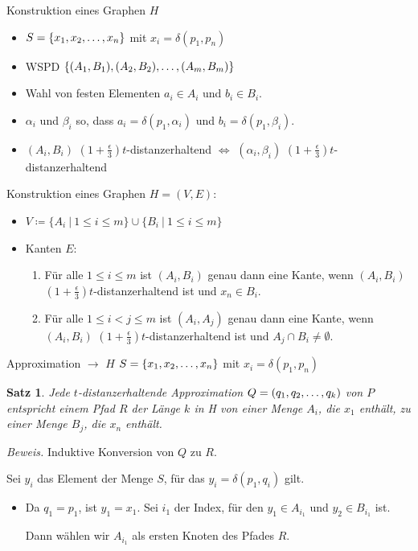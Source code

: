 \documentclass{beamer}
\newtheorem{thm}{Satz}
\begin{document}
	\begin{frame}[t]{Konstruktion eines Graphen $H$}
		\begin{block}{}
			\begin{itemize}
				\item $S = \{x_1, x_2, \mathellipsis, x_n\}$ mit $x_i = \delta(p_1, p_n)$
				\item WSPD $\{(A_1, B_1), (A_2, B_2), \mathellipsis, (A_m, B_m)\}$
			\end{itemize}
		\end{block}
		\begin{itemize}
			\item Wahl von festen Elementen $a_i \in A_i$ und $b_i \in B_i$.
			\item $\alpha_i$ und $\beta_i$ so, dass $a_i = \delta(p_1, \alpha_i)$ und $b_i = \delta(p_1, \beta_i)$.
			\item $(A_i, B_i)$ $(1 + \frac{\epsilon}{3})t$-distanzerhaltend $\Leftrightarrow$ $(\alpha_i, \beta_i)$ $(1 + \frac{\epsilon}{3})t$-distanzerhaltend
		\end{itemize}

		
		Konstruktion eines Graphen $H = (V, E)$:
		\begin{itemize}
			\item $V \coloneqq \{A_i\ |\ 1 \leq i \leq m\} \cup \{B_i\ |\ 1\leq i \leq m\}$
			\item Kanten $E$:
			\begin{enumerate}
				\item Für alle $1 \leq i \leq m$ ist $(A_i, B_i)$ genau dann eine Kante, wenn $(A_i, B_i)$ $(1 + \frac{\epsilon}{3})t$-distanzerhaltend ist und $x_n \in B_i$.
				\item Für alle $1\leq i < j \leq m$ ist $(A_i, A_j)$ genau dann eine Kante, wenn $(A_i, B_i)$ $(1 + \frac{\epsilon}{3})t$-distanzerhaltend ist und $A_j \cap B_i \neq \emptyset$.
			\end{enumerate}
		\end{itemize}
	\end{frame}
	
	\begin{frame}[t]{Approximation $\rightarrow$ $H$}
		$S = \{x_1, x_2, \mathellipsis, x_n\}$ mit $x_i = \delta(p_1, p_n)$
		\begin{thm}
			Jede $t$-distanzerhaltende Approximation $Q = (q_1, q_2, \mathellipsis, q_k)$ von $P$ entspricht einem Pfad $R$ der Länge $k$ in H von einer Menge $A_i$, die $x_1$ enthält, zu einer Menge $B_j$, die $x_n$ enthält.
		\end{thm}
		\textit{Beweis.} Induktive Konversion von $Q$ zu $R$.
		
		Sei $y_i$ das Element der Menge $S$, für das $y_i = \delta(p_1, q_i)$ gilt. 
		\begin{itemize}
			\item Da $q_1 = p_1$, ist $y_1 = x_1$.
			Sei $i_1$ der Index, für den $y_1 \in A_{i_1}$ und $y_2 \in B_{i_1}$ ist. 
			
			Dann wählen wir $A_{i_1}$ als ersten Knoten des Pfades $R$.
		\end{itemize}
	\end{frame}
	
\end{document}
